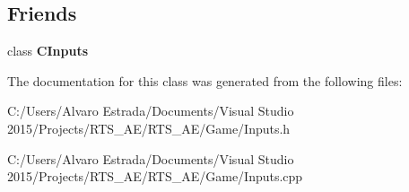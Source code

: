 \subsection*{Friends}
\begin{DoxyCompactItemize}
\item 
class {\bfseries C\+Inputs}\hypertarget{class_c_mouse_a3c2f69d998627f792e2b16160b50e2ef}{}\label{class_c_mouse_a3c2f69d998627f792e2b16160b50e2ef}

\end{DoxyCompactItemize}


The documentation for this class was generated from the following files\+:\begin{DoxyCompactItemize}
\item 
C\+:/\+Users/\+Alvaro Estrada/\+Documents/\+Visual Studio 2015/\+Projects/\+R\+T\+S\+\_\+\+A\+E/\+R\+T\+S\+\_\+\+A\+E/\+Game/Inputs.\+h\item 
C\+:/\+Users/\+Alvaro Estrada/\+Documents/\+Visual Studio 2015/\+Projects/\+R\+T\+S\+\_\+\+A\+E/\+R\+T\+S\+\_\+\+A\+E/\+Game/Inputs.\+cpp\end{DoxyCompactItemize}
